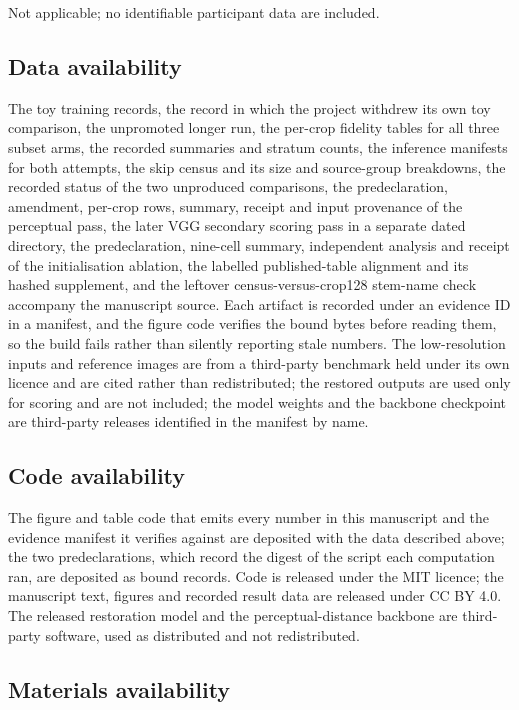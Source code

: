 Not applicable; no identifiable participant data are included.

\subsection*{Data availability}

The toy training records, the record in which the project withdrew its own toy
comparison, the unpromoted longer run, the per-crop fidelity tables for all
three subset arms, the recorded summaries and stratum counts, the inference
manifests for both attempts, the skip census and its size and source-group
breakdowns, the recorded status of the two unproduced comparisons, the
predeclaration, amendment, per-crop rows, summary, receipt and input provenance
of the perceptual pass, the later VGG secondary scoring pass in a separate
dated directory, the predeclaration, nine-cell summary, independent
analysis and receipt of the initialisation ablation, the labelled
published-table alignment and its hashed supplement, and the leftover
census-versus-crop128 stem-name check accompany the manuscript
source. Each artifact is recorded under an evidence ID in a manifest, and the
figure code verifies the bound bytes before reading them, so the build fails
rather than silently reporting stale numbers. The low-resolution inputs and
reference images are from a third-party benchmark held under its own licence
and are cited rather than redistributed; the restored outputs are used only for
scoring and are not included; the model weights and the backbone checkpoint are
third-party releases identified in the manifest by name.


\subsection*{Code availability}

The figure and table code that emits every number in this manuscript and the
evidence manifest it verifies against are deposited with the data described
above; the two predeclarations, which record the digest of the script each
computation ran, are deposited as bound records. Code is released under the
MIT licence; the manuscript text, figures and recorded result data are released
under CC BY 4.0. The released restoration model and the perceptual-distance
backbone are third-party software, used as distributed and not redistributed.

\subsection*{Materials availability}

